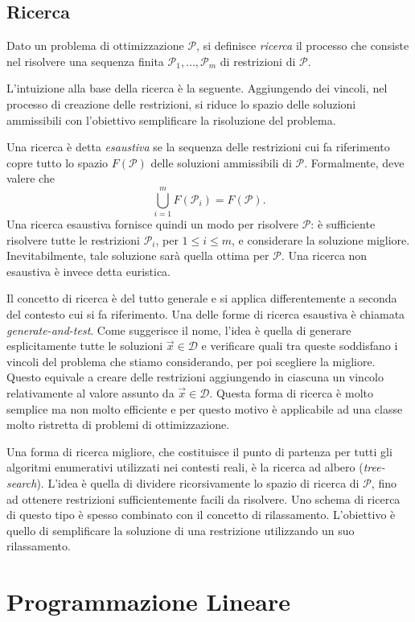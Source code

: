 \subsection{Ricerca}
\begin{definition}[Ricerca]
    Dato un problema di ottimizzazione $\mathcal{P}$, si definisce
    \mbox{\textit{ricerca}} il processo che consiste nel risolvere una
    sequenza finita $\mathcal{P}_1, \ldots, \mathcal{P}_m$ di restrizioni
    di $\mathcal{P}$.
\end{definition}
L'intuizione alla base della ricerca è la seguente. Aggiungendo dei
vincoli, nel processo di creazione delle restrizioni, si riduce lo
spazio delle soluzioni ammissibili con l'obiettivo semplificare la
risoluzione del problema.

Una ricerca è detta \textit{esaustiva} se la sequenza delle restrizioni cui
fa riferimento copre tutto lo spazio $F(\mathcal{P})$ delle soluzioni
ammissibili di $\mathcal{P}$. Formalmente, deve valere che
\begin{equation}
    \bigcup_{i=1}^{m}F(\mathcal{P}_i) = F(\mathcal{P}).
\end{equation}
Una ricerca esaustiva fornisce quindi un modo per risolvere $\mathcal{P}$:
è sufficiente risolvere tutte le restrizioni $\mathcal{P}_i$, per $1 \le i
\le m$, e considerare la soluzione migliore.  Inevitabilmente, tale
soluzione sarà quella ottima per $\mathcal{P}$. Una ricerca non esaustiva è
invece detta euristica.

Il concetto di ricerca è del tutto generale e si applica differentemente
a seconda del contesto cui si fa riferimento. Una delle forme di
ricerca esaustiva è chiamata \textit{generate-and-test}. Come suggerisce il
nome, l'idea è quella di generare esplicitamente tutte le soluzioni
$\vec{x} \in \mathcal{D}$ e verificare quali tra queste soddisfano i
vincoli del problema che stiamo considerando, per poi scegliere la
migliore. Questo equivale a creare delle restrizioni aggiungendo in
ciascuna un vincolo relativamente al valore assunto da $\vec{x} \in
\mathcal{D}$. Questa forma di ricerca è molto semplice ma non molto
efficiente e per questo motivo è applicabile ad una classe molto ristretta
di problemi di ottimizzazione.

Una forma di ricerca migliore, che costituisce il punto di partenza per
tutti gli algoritmi enumerativi utilizzati nei contesti reali, è la ricerca
ad albero (\textit{tree-search}). L'idea è quella di dividere
ricorsivamente lo spazio di ricerca di $\mathcal{P}$, fino ad ottenere
restrizioni sufficientemente facili da risolvere. Uno schema di ricerca di
questo tipo è spesso combinato con il concetto di rilassamento. L'obiettivo
è quello di semplificare la soluzione di una restrizione utilizzando un suo
rilassamento.

\section{Programmazione Lineare}

